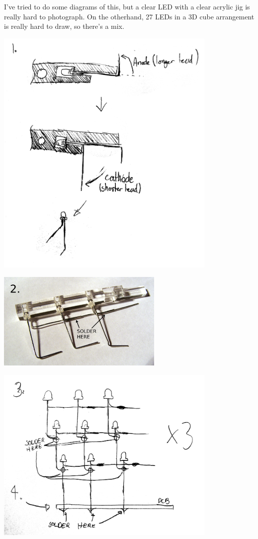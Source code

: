 \documentclass{article}
\begin{document}
I've tried to do some diagrams of this, but a clear LED with a clear
acrylic jig is really hard to photograph. On the otherhand, 27 LEDs in
a 3D cube arrangement is really hard to draw, so there's a mix. 

\centerline{
\includegraphics[width=0.8\textwidth]{s1.png}
}

\centerline{
\includegraphics[width=0.6\textwidth]{s2.JPG}
}

\centerline{
\includegraphics[width=0.8\textwidth]{s34.JPG}
}
\end{document}
